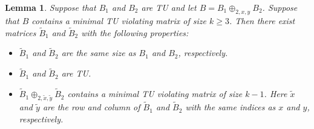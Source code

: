 \documentclass{article}
\newtheorem{lemma}{Lemma}
\theoremstyle{definition}
\begin{document}
\begin{lemma}\label{lem:two_sum_reg_mvm_induction}
    Suppose that $B_{1}$ and $B_{2}$ are TU and let $B = B_{1} \oplus_{2, x, y} B_{2}$. Suppose that $B$ contains a minimal TU violating matrix of size $k \geq 3$. Then there exist matrices $\tilde{B}_{1}$ and $\tilde{B}_{2}$ with the following properties:
    \begin{itemize}
        \item $\tilde{B}_{1}$ and $\tilde{B}_{2}$ are the same size as $B_{1}$ and $B_{2}$, respectively.
        \item $\tilde{B}_{1}$ and $\tilde{B}_{2}$ are TU.
        \item $\tilde{B}_{1} \oplus_{2, \tilde{x}, \tilde{y}} \tilde{B}_{2}$ contains a minimal TU violating matrix of size $k - 1$. Here $\tilde{x}$ and $\tilde{y}$ are the row and column of $\tilde{B}_{1}$ and $\tilde{B}_{2}$ with the same indices as $x$ and $y$, respectively.
    \end{itemize}
\end{lemma}
\end{document}

